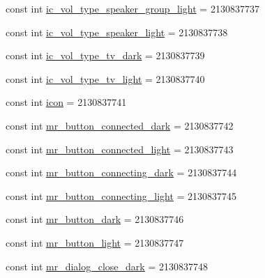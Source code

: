 \begin{DoxyCompactItemize}
\item 
const int \mbox{\hyperlink{class_f_w_p_s___app_1_1_droid_1_1_resource_1_1_drawable_a5562a5d670be391860d7daf0b0caae8e}{ic\+\_\+vol\+\_\+type\+\_\+speaker\+\_\+group\+\_\+light}} = 2130837737
\item 
const int \mbox{\hyperlink{class_f_w_p_s___app_1_1_droid_1_1_resource_1_1_drawable_abc4f9a884b15cad4464b80df568de727}{ic\+\_\+vol\+\_\+type\+\_\+speaker\+\_\+light}} = 2130837738
\item 
const int \mbox{\hyperlink{class_f_w_p_s___app_1_1_droid_1_1_resource_1_1_drawable_a65fcc041a7bc34239e871366fbfe78d9}{ic\+\_\+vol\+\_\+type\+\_\+tv\+\_\+dark}} = 2130837739
\item 
const int \mbox{\hyperlink{class_f_w_p_s___app_1_1_droid_1_1_resource_1_1_drawable_a34cd4613493e3364c3e746f139612017}{ic\+\_\+vol\+\_\+type\+\_\+tv\+\_\+light}} = 2130837740
\item 
const int \mbox{\hyperlink{class_f_w_p_s___app_1_1_droid_1_1_resource_1_1_drawable_a3ae91b6d1376e7cfe1755f469fbddc0b}{icon}} = 2130837741
\item 
const int \mbox{\hyperlink{class_f_w_p_s___app_1_1_droid_1_1_resource_1_1_drawable_ae4e088b7e611d97d3055cf5d87a5d484}{mr\+\_\+button\+\_\+connected\+\_\+dark}} = 2130837742
\item 
const int \mbox{\hyperlink{class_f_w_p_s___app_1_1_droid_1_1_resource_1_1_drawable_a3648c737eb40c89e788cda8af2f6dcab}{mr\+\_\+button\+\_\+connected\+\_\+light}} = 2130837743
\item 
const int \mbox{\hyperlink{class_f_w_p_s___app_1_1_droid_1_1_resource_1_1_drawable_a30767e218fa2628770ea3ba332f21335}{mr\+\_\+button\+\_\+connecting\+\_\+dark}} = 2130837744
\item 
const int \mbox{\hyperlink{class_f_w_p_s___app_1_1_droid_1_1_resource_1_1_drawable_a34e7365443317b44226750186dd29180}{mr\+\_\+button\+\_\+connecting\+\_\+light}} = 2130837745
\item 
const int \mbox{\hyperlink{class_f_w_p_s___app_1_1_droid_1_1_resource_1_1_drawable_a1461bd34da5b7f61b7d26e5bbb763592}{mr\+\_\+button\+\_\+dark}} = 2130837746
\item 
const int \mbox{\hyperlink{class_f_w_p_s___app_1_1_droid_1_1_resource_1_1_drawable_aadfea350cac1d10eaea7f3615e146cc1}{mr\+\_\+button\+\_\+light}} = 2130837747
\item 
const int \mbox{\hyperlink{class_f_w_p_s___app_1_1_droid_1_1_resource_1_1_drawable_a2f31ef347fe7967caa2234200a899797}{mr\+\_\+dialog\+\_\+close\+\_\+dark}} = 2130837748

\end{DoxyCompactItemize}
